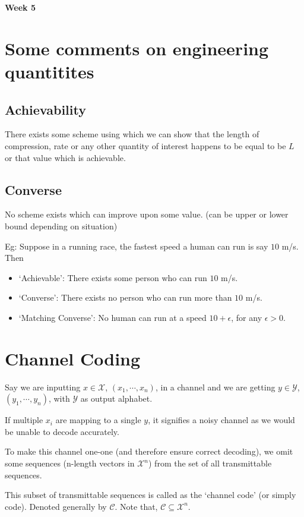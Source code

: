 \documentclass{article}
\begin{document}
\begin{center}
\textbf{\huge{Week 5}}
\end{center}
\section{Some comments on engineering quantitites}

\subsection{Achievability}

There exists some scheme using which we can show that the length of compression, rate or any other quantity of interest happens to be equal to be $L$ or that value which is achievable.

\subsection{Converse}
No scheme exists which can improve upon some value. (can be upper or lower bound depending on situation)


Eg: Suppose in a running race, the fastest speed a human can run is say $10$ m/s. Then
\begin{itemize}
    \item `Achievable': There exists some person who can run $10$ m/s.
    \item `Converse': There exists no person who can run more than $10$ m/s.
    \item `Matching Converse': No human can run at a speed $10+ \epsilon$, for any $\epsilon >0$.
\end{itemize}

\section{Channel Coding}
Say we are inputting $x \in \mathcal{X}$, $(x_1,\cdots, x_n)$, in a channel and we are getting $y \in \mathcal{Y}$, $(y_1, \cdots, y_n)$, with $\mathcal{Y}$ as output alphabet.

If multiple $x_i$ are mapping to a single $y$, it signifies a noisy channel as we would be unable to decode accurately.

To make this channel one-one (and therefore ensure correct decoding), we omit some sequences (n-length vectors in $\mathcal{X}^n$) from the set of all transmittable sequences.

This subset of transmittable sequences is called as the `channel code' (or simply code). Denoted generally by $\mathscr{C}$. Note that, $\mathscr{C} \subseteq \mathcal{X}^n$.
\end{document}

